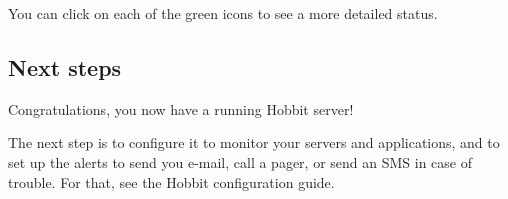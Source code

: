  You can click on each of the green icons to see a more detailed status.
\subsection{Next steps}


 Congratulations, you now have a running Hobbit server!


 The next step is to configure it to monitor your servers and
 applications, and to set up the alerts to send you e-mail, call a
 pager, or send an SMS in case of trouble. For that, see the Hobbit
 configuration guide.





